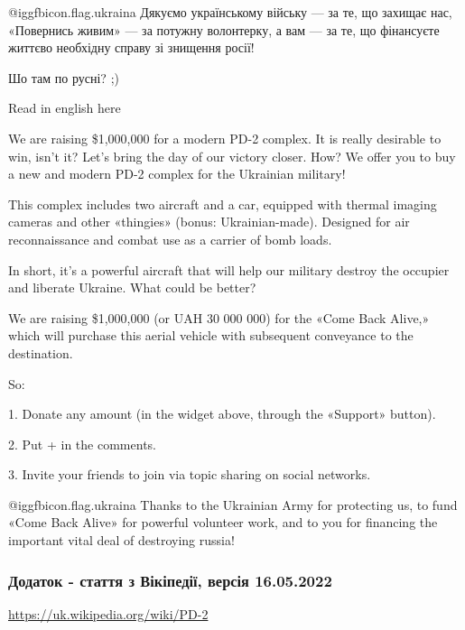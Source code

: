 @igg{fbicon.flag.ukraina} Дякуємо українському війську — за те, що захищає нас,
«Повернись живим» — за потужну волонтерку, а вам — за те, що фінансуєте життєво
необхідну справу зі знищення росії!


Шо там по русні? ;)

Read in english here

We are raising \$1,000,000 for a modern PD-2 complex. It is really desirable to
win, isn't it? Let's bring the day of our victory closer. How? We offer you to
buy a new and modern PD-2 complex for the Ukrainian military!

This complex includes two aircraft and a car, equipped with thermal imaging
cameras and other «thingies» (bonus: Ukrainian-made). Designed for air
reconnaissance and combat use as a carrier of bomb loads.

In short, it's a powerful aircraft that will help our military destroy the
occupier and liberate Ukraine. What could be better?

We are raising \$1,000,000 (or UAH 30 000 000) for the «Come Back Alive,» which
will purchase this aerial vehicle with subsequent conveyance to the
destination.

So:

1. Donate any amount (in the widget above, through the «Support» button).

2. Put + in the comments.

3. Invite your friends to join via topic sharing on social networks.

@igg{fbicon.flag.ukraina} Thanks to the Ukrainian Army for protecting us, to
fund «Come Back Alive» for powerful volunteer work, and to you for financing
the important vital deal of destroying russia!

\subsubsection{Додаток - стаття з Вікіпедії, версія 16.05.2022}

\url{https://uk.wikipedia.org/wiki/PD-2}

